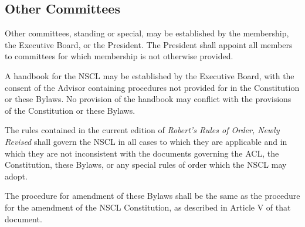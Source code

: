 \documentclass{bylaws_nofont}
\newcommand{\NSCL}{\textsc{NSCL}\xspace}
\newcommand{\ACL}{\textsc{ACL}\xspace}
\begin{document}
\begin{linenumbers}[1]
  \section{Other Committees}
  Other committees, standing or special, may be established by the
  membership, the Executive Board, or the President. The President shall
  appoint all members to committees for which membership is not
  otherwise provided.\\

  \pagebreak

  A handbook for the \NSCL may be established by the Executive Board,
  with the consent of the Advisor containing procedures not provided for
  in the Constitution or these Bylaws. No provision of the handbook may
  conflict with the provisions of the Constitution or these Bylaws.\\

  
  The rules contained in the current edition of \textit{Robert's Rules
    of Order, Newly Revised} shall govern the \NSCL in all cases to
  which they are applicable and in which they are not inconsistent with
  the documents governing the \ACL, the Constitution, these Bylaws, or
  any special rules of order which the \NSCL may adopt.\\

  
  The procedure for amendment of these Bylaws shall be the same as the
  procedure for the amendment of the \NSCL Constitution, as described in
  Article V of that document.
  
\end{linenumbers}
\end{document}
